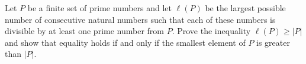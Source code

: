 Let $P$ be a finite set of prime numbers and let $\ell(P)$ be the largest possible number of
consecutive natural numbers such that each of these numbers is divisible by at
least one prime number from $P$. Prove the inequality $\ell(P) \geq |P|$ and show that
equality holds if and only if the smallest element of $P$ is greater than $|P|$.